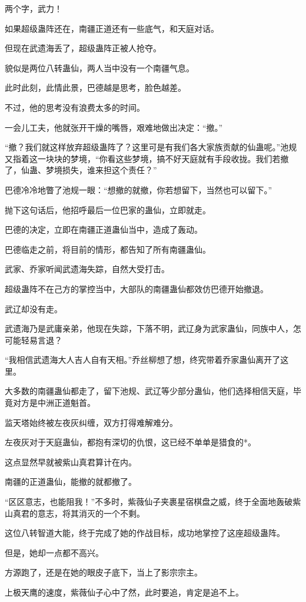 \begin{this_body}
两个字，武力！

如果超级蛊阵还在，南疆正道还有一些底气，和天庭对话。

但现在武遗海丢了，超级蛊阵正被人抢夺。

貌似是两位八转蛊仙，两人当中没有一个南疆气息。

此时此刻，此情此景，巴德越是思考，脸色越差。

不过，他的思考没有浪费太多的时间。

一会儿工夫，他就张开干燥的嘴唇，艰难地做出决定：“撤。”

“撤？我们就这样放弃超级蛊阵了？这里可是有我们各大家族贡献的仙蛊呢。”池规又指着这一块块的梦境，“你看这些梦境，搞不好天庭就有手段收拢。我们若撤了，仙蛊、梦境损失，谁来担这个责任？”

巴德冷冷地瞥了池规一眼：“想撤的就撤，你若想留下，当然也可以留下。”

抛下这句话后，他招呼最后一位巴家的蛊仙，立即就走。

巴德的决定，立即在南疆正道蛊仙当中，造成了轰动。

巴德临走之前，将目前的情形，都告知了所有南疆蛊仙。

武家、乔家听闻武遗海失踪，自然大受打击。

超级蛊阵不在己方的掌控当中，大部队的南疆蛊仙都效仿巴德开始撤退。

武辽却没有走。

武遗海乃是武庸亲弟，他现在失踪，下落不明，武辽身为武家蛊仙，同族中人，怎可能轻易言退？

“我相信武遗海大人吉人自有天相。”乔丝柳想了想，终究带着乔家蛊仙离开了这里。

大多数的南疆蛊仙都走了，留下池规、武辽等少部分蛊仙，他们选择相信天庭，毕竟对方是中洲正道魁首。

监天塔始终被左夜灰纠缠，双方打得难解难分。

左夜灰对于天庭蛊仙，都抱有深切的仇恨，这已经不单单是猎食的*。

这点显然早就被紫山真君算计在内。

南疆的正道蛊仙，能撤的就都撤了。

“区区意志，也能阻我！”不多时，紫薇仙子夹裹星宿棋盘之威，终于全面地轰破紫山真君的意志，将其消灭的一个不剩。

这位八转智道大能，终于完成了她的作战目标，成功地掌控了这座超级蛊阵。

但是，她却一点都不高兴。

方源跑了，还是在她的眼皮子底下，当上了影宗宗主。

上极天鹰的速度，紫薇仙子心中了然，此时要追，肯定是追不上。


\end{this_body}
